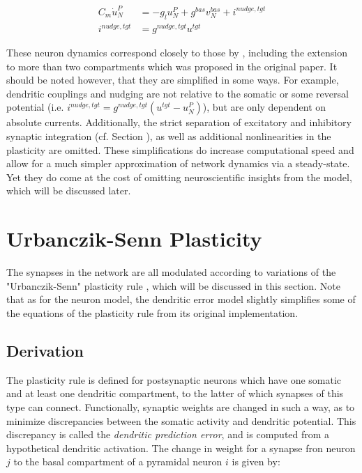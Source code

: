 \begin{align}
  C_m \dot{u}_N^P & = - g_l u_N^{P} + g^{bas} v_N^{bas} + i^{nudge, tgt} \\
  i^{nudge, tgt}  & = g^{nudge, tgt} u^{tgt}
\end{align}


These neuron dynamics correspond closely to those by \cite{urbanczik2014learning}, including the extension to more than
two compartments which was proposed in the original paper. It should be noted however, that they are simplified in some
ways. For example, dendritic couplings and nudging are not relative to the somatic or some reversal potential (i.e.
$i^{nudge, tgt}= g^{nudge, tgt} (u^{tgt} - u_N^P )$), but are only dependent on absolute currents. Additionally, the
strict separation of excitatory and inhibitory synaptic integration (cf. Section ), as well as
additional nonlinearities in the plasticity are omitted.  These simplifications do increase computational speed and
allow for a much simpler approximation of network dynamics via a steady-state. Yet they do come at the cost of omitting
neuroscientific insights from the model, which will be discussed later.

\section{Urbanczik-Senn Plasticity}\label{sec-urb-senn-plast}

The synapses in the network are all modulated according to variations of the "Urbanczik-Senn" plasticity rule
\citep{urbanczik2014learning}, which will be discussed in this section. Note that as for the neuron model, the dendritic
error model slightly simplifies some of the equations of the plasticity rule from its original implementation.

\subsection{Derivation}

The plasticity rule is defined for postsynaptic neurons which have one somatic and at least one dendritic compartment,
to the latter of which synapses of this type can connect. Functionally, synaptic weights are changed in such a way, as
to minimize discrepancies between the somatic activity and dendritic potential. This discrepancy is called the
\textit{dendritic prediction error}, and is computed from a hypothetical dendritic activation. The change in weight for
a synapse fron neuron $j$ to the basal compartment of a pyramidal neuron $i$ is given by:

